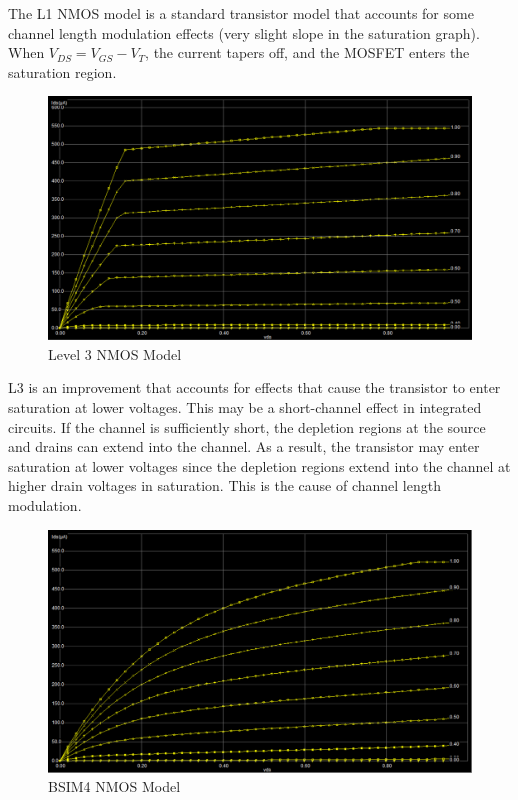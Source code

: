 The L1 NMOS model is a standard transistor model that accounts for some channel length modulation effects (very slight slope in the saturation graph).
When $V_{DS} = V_{GS} - V_{T}$, the current tapers off, and the MOSFET enters the saturation region.

\FloatBarrier

\begin{figure}[h!]
	\centering
	\includegraphics[scale=0.50]{./images/level3_id_vds_nmos.PNG}
	\caption{Level 3 NMOS Model}
	\label{fig:l3_mos}
\end{figure}

\FloatBarrier

L3 is an improvement that accounts for effects that cause the transistor to enter saturation at lower voltages.
This may be a short-channel effect in integrated circuits.
If the channel is sufficiently short, the depletion regions at the source and drains can extend into the channel.
As a result, the transistor may enter saturation at lower voltages since the depletion regions extend into the channel at higher drain voltages in saturation.
This is the cause of channel length modulation.

\FloatBarrier

\begin{figure}[h!]
	\centering
	\includegraphics[scale=0.50]{./images/bsim4_id_vds_nmos.PNG}
	\caption{BSIM4 NMOS Model}
	\label{fig:bsim4_mos}
\end{figure}

